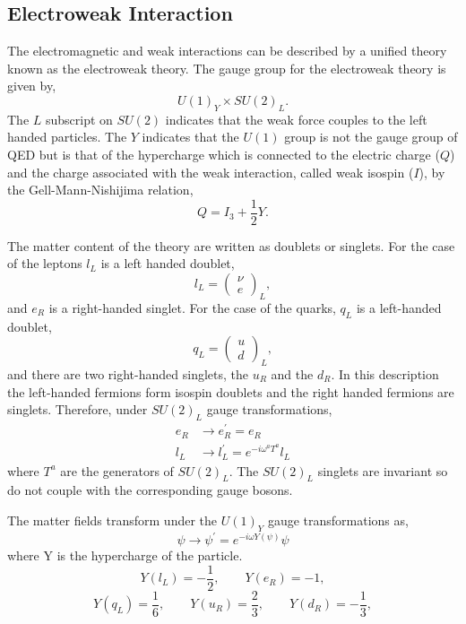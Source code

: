 \subsection{Electroweak Interaction}
The electromagnetic and weak interactions can be described by a unified theory
known as the electroweak theory.
The gauge group for the electroweak theory is given by,
\begin{equation}
U(1)_{Y} \times SU(2)_{L} .
\end{equation}
The $L$ subscript on $SU(2)$ indicates that the weak force couples to the left
handed particles. 
The $Y$ indicates that the $U(1)$ group is not the gauge
group of QED but is that of the hypercharge which is connected to the electric
charge ($Q$) and the charge associated with the weak interaction, called weak
isospin ($I$), by the Gell-Mann-Nishijima relation,
\begin{equation}
Q = I_{3}+ \frac{1}{2}Y.
\end{equation}

The matter content of the theory are written as doublets or singlets. 
For the case of the leptons $l_{L}$ is a left
handed doublet,
\begin{equation}
l_{L} = \left( \begin{matrix} \nu \\ e \end{matrix} \right)_{L},
\end{equation}
and $e_{R}$ is a right-handed singlet.
For the case of the quarks, $q_{L}$ is a left-handed doublet,
\begin{equation}
q_{L} = \left( \begin{matrix} u\\ d \end{matrix} \right)_{L},
\end{equation}
and there are two right-handed singlets, the $u_{R}$ and the $d_{R}$.
In this description the left-handed fermions form isospin doublets and the right
handed fermions are singlets. Therefore, under $SU(2)_L$ gauge transformations,
\begin{align}
e_{R} &\to e_{R}^{\prime} = e_{R}\\
l_{L} &\to l_{L}^{\prime} = e^{-i \omega^{a} {T}^{a} }l_{L}
\end{align}
where $T^{a}$ are the generators of $SU(2)_L$.  The $SU(2)_L$ singlets are invariant
so do not couple with the corresponding gauge bosons.

The matter fields transform under the $U(1)_Y$ gauge transformations as,
\begin{equation}
\psi \to \psi^{\prime} = e^{-i\omega Y(\psi)}\psi
\end{equation}
where Y is the hypercharge of the particle.
\begin{equation}
Y(l_{L}) = -\frac{1}{2}, \qquad Y(e_{R}) = -1,
\end{equation}
\begin{equation}
Y(q_{L}) =  \frac{1}{6}, \qquad Y(u_{R}) =  \frac{2}{3}, \qquad Y(d_{R}) = -\frac{1}{3},
\end{equation}

